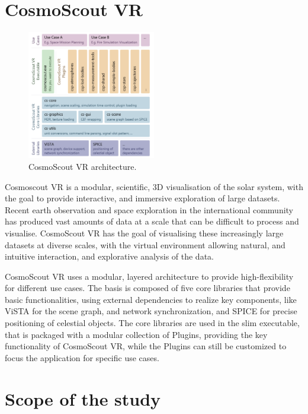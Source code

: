 \section{CosmoScout VR}\label{sec:cosmoscout-vr}

\begin{figure}
    \centering
    \includegraphics[width=0.5\textwidth]{content/1_introduction/img/cosmoscout-architecture}
    \caption{CosmoScout VR architecture.}
    \label{fig:cosmoscout-architecture}
\end{figure}

Cosmoscout VR is a modular, scientific, 3D visualisation of the solar system, with the goal to provide interactive,
and immersive exploration of large datasets.
Recent earth observation and space exploration in the international community has produced vast amounts of data at a
scale that can be difficult to process and visualise.
CosmoScout VR has the goal of visualising these increasingly large datasets at diverse scales, with the virtual
environment allowing natural, and intuitive interaction, and explorative analysis of the data.

CosmoScout VR uses a modular, layered architecture to provide high-flexibility for different use cases.
The basis is composed of five core libraries that provide basic functionalities, using external dependencies to
realize key components, like ViSTA for the scene graph, and network synchronization, and SPICE for precise positioning
of celestial objects.
The core libraries are used in the slim executable, that is packaged with a modular collection of Plugins, providing
the key functionality of CosmoScout VR, while the Plugins can still be customized to focus the application for
specific use cases.


\section{Scope of the study}\label{sec:scope-of-the-study}
